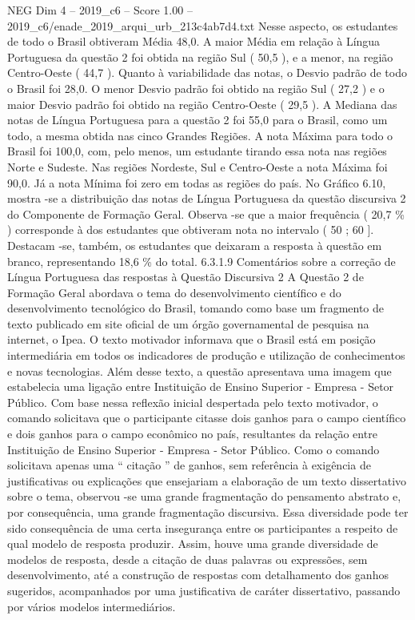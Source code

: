 \begin{textsample}{NEG Dim 4 – 2019\_c6 – Score 1.00 – 2019\_c6/enade\_2019\_arqui\_urb\_213c4ab7d4.txt}
Nesse aspecto, os estudantes de todo o Brasil obtiveram Média 48,0.
A maior Média em relação à Língua Portuguesa da questão 2 foi obtida na região Sul ( 50,5 ), e a menor, na região Centro-Oeste ( 44,7 ).
Quanto à variabilidade das notas, o Desvio padrão de todo o Brasil foi 28,0.
O menor Desvio padrão foi obtido na região Sul ( 27,2 ) e o maior Desvio padrão foi obtido na região Centro-Oeste ( 29,5 ).
A Mediana das notas de Língua Portuguesa para a questão 2 foi 55,0 para o Brasil, como um todo, a mesma obtida nas cinco Grandes Regiões.
A nota Máxima para todo o Brasil foi 100,0, com, pelo menos, um estudante tirando essa nota nas regiões Norte e Sudeste.
Nas regiões Nordeste, Sul e Centro-Oeste a nota Máxima foi 90,0.
Já a nota Mínima foi zero em todas as regiões do país.
No Gráfico 6.10, mostra -se a distribuição das notas de Língua Portuguesa da questão discursiva 2 do Componente de Formação Geral.
Observa -se que a maior frequência ( 20,7 \% ) corresponde à dos estudantes que obtiveram nota no intervalo ( 50 ; 60 ].
Destacam -se, também, os estudantes que deixaram a resposta à questão em branco, representando 18,6 \% do total. 6.3.1.9 Comentários sobre a correção de Língua Portuguesa das respostas à Questão Discursiva 2 A Questão 2 de Formação Geral abordava o tema do desenvolvimento científico e do desenvolvimento tecnológico do Brasil, tomando como base um fragmento de texto publicado em site oficial de um órgão governamental de pesquisa na internet, o Ipea.
O texto motivador informava que o Brasil está em posição intermediária em todos os indicadores de produção e utilização de conhecimentos e novas tecnologias.
Além desse texto, a questão apresentava uma imagem que estabelecia uma ligação entre Instituição de Ensino Superior - Empresa - Setor Público.
Com base nessa reflexão inicial despertada pelo texto motivador, o comando solicitava que o participante citasse dois ganhos para o campo científico e dois ganhos para o campo econômico no país, resultantes da relação entre Instituição de Ensino Superior - Empresa - Setor Público.
Como o comando solicitava apenas uma “ citação ” de ganhos, sem referência à exigência de justificativas ou explicações que ensejariam a elaboração de um texto dissertativo sobre o tema, observou -se uma grande fragmentação do pensamento abstrato e, por consequência, uma grande fragmentação discursiva.
Essa diversidade pode ter sido consequência de uma certa insegurança entre os participantes a respeito de qual modelo de resposta produzir.
Assim, houve uma grande diversidade de modelos de resposta, desde a citação de duas palavras ou expressões, sem desenvolvimento, até a construção de respostas com detalhamento dos ganhos sugeridos, acompanhados por uma justificativa de caráter dissertativo, passando por vários modelos intermediários.

\end{textsample}
